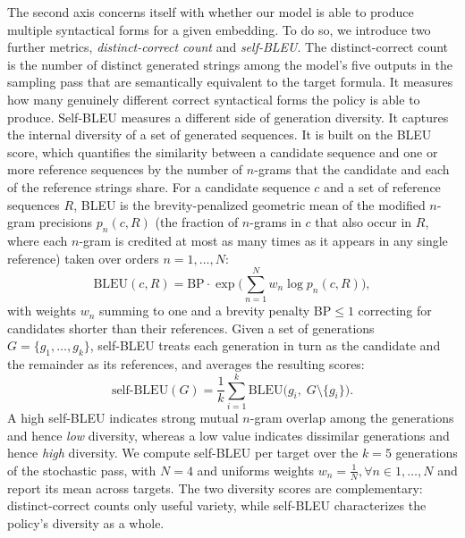 \documentclass[titlepage,a4paper,11pt]{report}
\begin{document}
    
    The second axis concerns itself with whether our model is able to produce multiple syntactical forms for a given embedding. To do so, we introduce two further metrics, \textit{distinct-correct count} and \textit{self-BLEU}. The distinct-correct count is the number of distinct generated strings among the model's five outputs in the sampling pass that are semantically equivalent to the target formula. It measures how many genuinely different correct syntactical forms the policy is able to produce. Self-BLEU \citep{zhu_texygen_2018} measures a different side of generation diversity. It captures the internal diversity of a set of generated sequences. It is built on the BLEU score, which quantifies the similarity between a candidate sequence and one or more reference sequences by the number of $n$-grams that the candidate and each of the reference strings share. For a candidate sequence $c$ and a set of reference sequences $R$, BLEU is the brevity-penalized geometric mean of the modified $n$-gram precisions $p_n(c, R)$ (the fraction of $n$-grams in $c$ that also occur in $R$, where each $n$-gram is credited at most as many times as it appears in any single reference) taken over orders $n = 1, \dots, N$:
    \begin{equation}
        \text{BLEU}(c, R) = \mathrm{BP}\cdot\exp\!\Big(\textstyle\sum_{n=1}^{N} w_n \log p_n(c, R)\Big),
    \end{equation}
    with weights $w_n$ summing to one and a brevity penalty $\mathrm{BP} \le 1$ correcting for candidates shorter than their references. Given a set of generations $G = \{g_1, \dots, g_k\}$, self-BLEU treats each generation in turn as the candidate and the remainder as its references, and averages the resulting scores:
    \begin{equation}
        \text{self-BLEU}(G) = \frac{1}{k}\sum_{i=1}^{k} \text{BLEU}\big(g_i,\; G \setminus \{g_i\}\big).
    \end{equation}
    A high self-BLEU indicates strong mutual $n$-gram overlap among the generations and hence \emph{low} diversity, whereas a low value indicates dissimilar generations and hence \emph{high} diversity. We compute self-BLEU per target over the $k = 5$ generations of the stochastic pass, with $N=4$ and uniforms weights $w_n = \frac{1}{N}, \forall n \in 1,\dots,N$ and report its mean across targets. The two diversity scores are complementary: distinct-correct counts only useful variety, while self-BLEU characterizes the policy's diversity as a whole.
\end{document}
